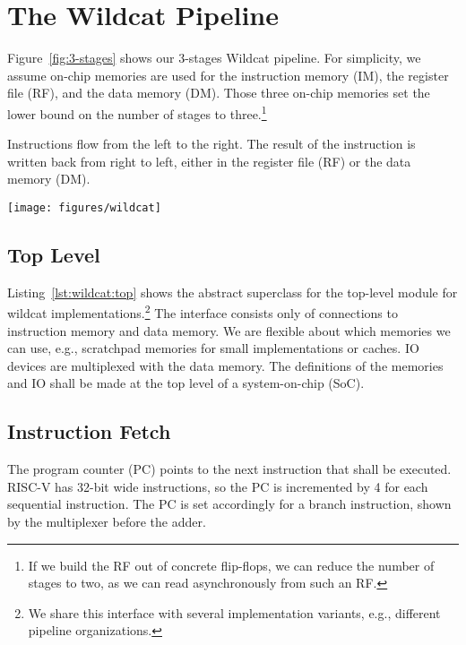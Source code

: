 \documentclass[%
    10pt,
    headinclude, footexclude,
    openright, %
    notitlepage,
    cleardoubleempty,
    headsepline,
    pointlessnumbers,
    bibtotoc, idxtotoc,
    ]{scrbook}
\begin{document}
\section{The Wildcat Pipeline}

Figure~\ref{fig:3-stages} shows our 3-stages Wildcat pipeline. For simplicity, we
assume on-chip memories are used for the instruction memory (IM), the register file (RF),
and the data memory (DM). Those three on-chip memories set the lower bound
on the number of stages to three.\footnote{If we build the RF out of concrete flip-flops, we can
reduce the number of stages to two, as we can read asynchronously from such
an RF.}

Instructions flow from the
left to the right. The result of the instruction is written back from right to left,
either in the register file (RF) or the data memory (DM).

\begin{figure*}
  \centering
  \texttt{[image: figures/wildcat]}
  \caption{The 3-stage Wildcat processor pipeline (simplified, omitting control and decoded signals).}
  \label{fig:3-stages}
\end{figure*}

\subsection{Top Level}


Listing~\ref{lst:wildcat:top} shows the abstract superclass for the top-level module for
wildcat implementations.\footnote{We share this interface with several implementation
variants, e.g., different pipeline organizations.}
The interface consists only of connections to instruction memory and data
memory. We are flexible about which memories we can use, e.g., scratchpad memories for
small implementations or caches. IO devices are multiplexed with the data memory.
The definitions of the memories and IO shall be made at the top level of a system-on-chip (SoC).

\subsection{Instruction Fetch}

The program counter (PC) points to the next instruction that shall be executed.
RISC-V has 32-bit wide instructions, so the PC is incremented by 4 for each sequential
instruction. The PC is set accordingly for a branch instruction, shown by the multiplexer
before the adder.
\end{document}
